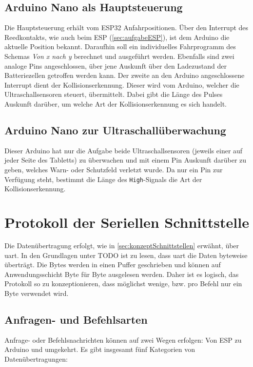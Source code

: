 \subsection{Arduino Nano als Hauptsteuerung}
\label{sec:aufgabeArduinoNanoMotor}
Die Hauptsteuerung erhält vom ESP32 Anfahrpositionen. Über den Interrupt des Reedkontakts, wie auch beim ESP (\autoref{sec:aufgabeESP}), ist dem Arduino die aktuelle Position bekannt. Daraufhin soll ein individuelles Fahrprogramm des Schemas \textit{Von x nach y} berechnet und ausgeführt werden. Ebenfalls sind zwei analoge Pins angeschlossen, über jene Auskunft über den Ladezustand der Batteriezellen getroffen werden kann. Der zweite an den Arduino angeschlossene Interrupt dient der Kollisionserkennung. Dieser wird vom Arduino, welcher die Ultraschallsensoren steuert, übermittelt. Dabei gibt die Länge des Pulses Auskunft darüber, um welche Art der Kollisionserkennung es sich handelt.

\subsection{Arduino Nano zur Ultraschallüberwachung} 
\label{sec:aufgabeArduinoNanoUltraschall}
Dieser Arduino hat nur die Aufgabe beide Ultraschallsensoren (jeweils einer auf jeder Seite des Tabletts) zu überwachen und mit einem Pin Auskunft darüber zu geben, welches Warn- oder Schutzfeld verletzt wurde. Da nur ein Pin zur Verfügung steht, bestimmt die Länge des \texttt{High}-Signals die Art der Kollisionserkennung.

\section{Protokoll der Seriellen Schnittstelle}
Die Datenübertragung erfolgt, wie in \autoref{sec:konzeptSchnittstellen} erwähnt, über \acrshort{uart}. In den Grundlagen unter TODO ist zu lesen, dass \acrshort{uart} die Daten byteweise überträgt. Die Bytes werden in einen Puffer geschrieben und können auf Anwendungsschicht Byte für Byte ausgelesen werden. Daher ist es logisch, das Protokoll so zu konzeptionieren, dass möglichst wenige, bzw. pro Befehl nur ein Byte verwendet wird. 

\subsection{Anfragen- und Befehlsarten}
Anfrage- oder Befehlsnachrichten können auf zwei Wegen erfolgen: Von ESP zu Arduino und umgekehrt. Es gibt insgesamt fünf Kategorien von Datenübertragungen:

